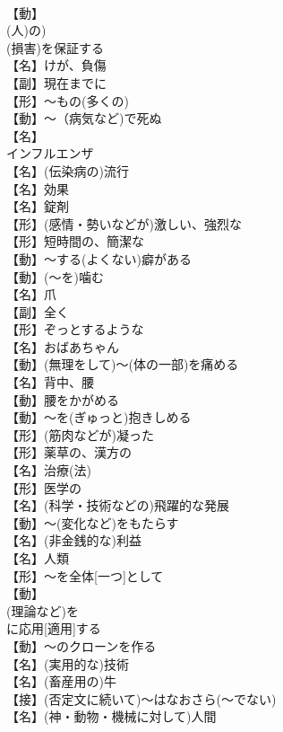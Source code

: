 \documentclass[8pt]{extreport}
\begin{document}
\begin{CJK}{UTF8}{min}
\\	【動】
\\	(人)の)
\\	(損害)を保証する
\\	【名】けが、負傷
\\	【副】現在までに
\\	【形】～もの(多くの)
\\	【動】～（病気など)で死ぬ
\\	【名】
\\	インフルエンザ
\\	【名】(伝染病の)流行
\\	【名】効果
\\	【名】錠剤
\\	【形】(感情・勢いなどが)激しい、強烈な
\\	【形】短時間の、簡潔な
\\	【動】～する(よくない)癖がある
\\	【動】(～を)噛む
\\	【名】爪
\\	【副】全く
\\	【形】ぞっとするような
\\	【名】おばあちゃん
\\	【動】(無理をして)～(体の一部)を痛める
\\	【名】背中、腰
\\	【動】腰をかがめる
\\	【動】～を(ぎゅっと)抱きしめる
\\	【形】(筋肉などが)凝った
\\	【形】薬草の、漢方の
\\	【名】治療(法)
\\	【形】医学の
\\	【名】(科学・技術などの)飛躍的な発展
\\	【動】～(変化など)をもたらす
\\	【名】(非金銭的な)利益
\\	【名】人類
\\	【形】～を全体[一つ]として
\\	【動】
\\	(理論など)を
\\	に応用[適用]する
\\	【動】～のクローンを作る
\\	【名】(実用的な)技術
\\	【名】(畜産用の)牛
\\	【接】(否定文に続いて)～はなおさら(～でない)
\\	【名】(神・動物・機械に対して)人間

\end{CJK}
\end{document}
